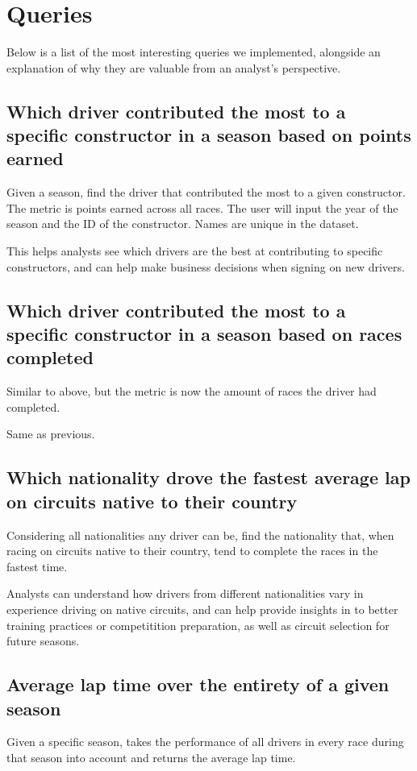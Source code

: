\documentclass[]{article}
\begin{document}
\section{Queries}

Below is a list of the most interesting queries we implemented, alongside an explanation of why they are valuable from an analyst's perspective.

\subsection{Which driver contributed the most to a specific constructor in a season based on points earned}

Given a season, find the driver that contributed the most to a given constructor. The metric is points earned across all races. The user will input the year of the season and the ID of the constructor. Names are unique in the dataset.

This helps analysts see which drivers are the best at contributing to specific constructors, and can help make business decisions when signing on new drivers.

\subsection{Which driver contributed the most to a specific constructor in a season based on races completed}
Similar to above, but the metric is now the amount of races the driver had completed.

Same as previous.

\subsection{Which nationality drove the fastest average lap on circuits native to their country}
Considering all nationalities any driver can be, find the nationality that, when racing on circuits native to their country, tend to complete the races in the fastest time.

Analysts can understand how drivers from different nationalities vary in experience driving on native circuits, and can help provide insights in to better training practices or competitition preparation, as well as circuit selection for future seasons.

\subsection{Average lap time over the entirety of a given season}
Given a specific season, takes the performance of all drivers in every race during that season into account and returns the average lap time. 
\end{document}
